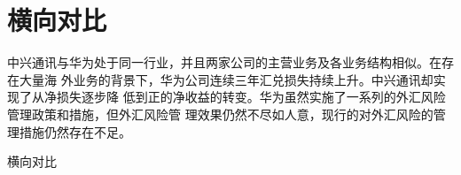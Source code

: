 \documentclass[../main]{subfiles}
\begin{document}
\section{横向对比}%
\label{sec:横向对比}

中兴通讯与华为处于同一行业，并且两家公司的主营业务及各业务结构相似。在存在大量海
外业务的背景下，华为公司连续三年汇兑损失持续上升。中兴通讯却实现了从净损失逐步降
低到正的净收益的转变。华为虽然实施了一系列的外汇风险管理政策和措施，但外汇风险管
理效果仍然不尽如人意，现行的对外汇风险的管理措施仍然存在不足。

\begin{table}[htbp]
	\centering
	\caption{横向对比}
	\label{tab:横向对比}
\end{table}
\end{document}
